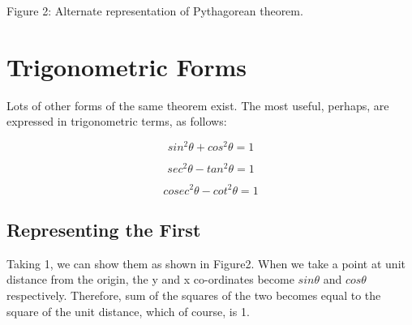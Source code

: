 \documentclass{article}
\begin{document}
\newpage

\begin{center} 
\end{center} 

\begin{center}
Figure 2: Alternate representation of Pythagorean theorem.
\end{center}

\section{Trigonometric Forms}
Lots of other forms of the same theorem exist.  The most useful, perhaps, are
expressed in trigonometric terms, as follows:

\begin{equation} \label{eq1}
sin^2\theta+cos^2\theta=1
\end{equation}

\begin{equation} \label{eq2}
sec^2\theta-tan^2\theta=1
\end{equation}

\begin{equation} \label{eq3}
cosec^2\theta-cot^2\theta=1
\end{equation}

\subsection{Representing the First}
Taking 1,  we can show them as shown in Figure2.  When we take a point at
unit distance from the origin, the y and x co-ordinates become $sin\theta$ and $cos\theta$
respectively.   Therefore,  sum  of  the  squares  of  the  two  becomes  equal  to  the
square of the unit distance, which of course, is 1.
\end{document}
